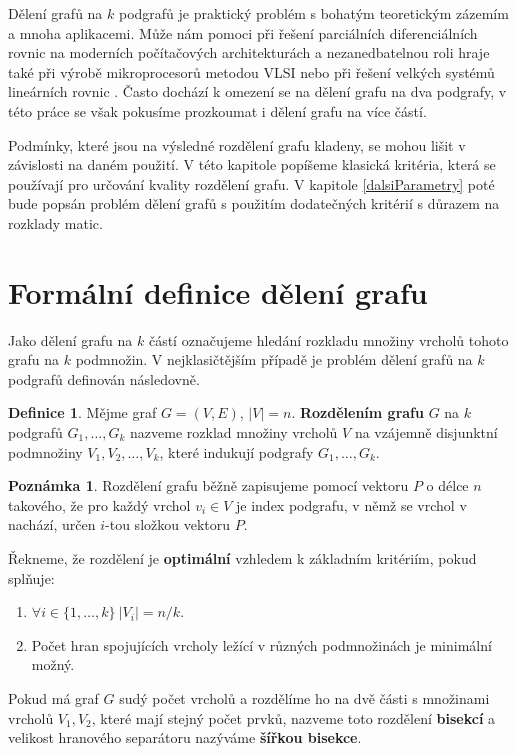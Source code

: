 \documentclass[11pt,american,czech,oneside]{book}
\theoremstyle{plain}
\theoremstyle{definition}
\newtheorem{definition}{Definice}
\newtheorem{remark}{Poznámka}
\begin{document}
Dělení grafů na $k$ podgrafů je praktický problém s bohatým teoretickým zázemím a mnoha aplikacemi. Může nám pomoci při řešení parciálních diferenciálních rovnic na moderních počítačových architekturách \cite{posl:90} a nezanedbatelnou roli hraje také při výrobě mikroprocesorů metodou VLSI nebo při řešení velkých systémů lineárních rovnic \cite{keli:70, pis:84}. Často dochází k omezení se na dělení grafu na dva podgrafy, v této práce se však pokusíme prozkoumat i dělení grafu na více částí.

Podmínky, které jsou na výsledné rozdělení grafu kladeny, se mohou lišit v závislosti na daném použití. V této kapitole popíšeme klasická kritéria, která se používají pro určování kvality rozdělení grafu. V kapitole \ref{dalsiParametry} poté bude popsán problém dělení grafů s použitím dodatečných kritérií s důrazem na rozklady matic.

\section{Formální definice dělení grafu}

Jako dělení grafu na $k$ částí označujeme hledání rozkladu množiny vrcholů tohoto grafu na $k$ podmnožin. V nejklasičtějším případě je problém dělení grafů na $k$ podgrafů definován následovně.
\begin{definition}
  Mějme graf $G=(V,E)$, $|V| = n$. \textbf{Rozdělením grafu} $G$ na $k$ podgrafů $G_1, \ldots, G_k$ nazveme rozklad množiny vrcholů $V$ na vzájemně disjunktní podmnožiny $V_1, V_2, \ldots, V_k$, které indukují podgrafy $G_1, \ldots, G_k$.   
\end{definition}

\begin{remark}
  Rozdělení grafu běžně zapisujeme pomocí vektoru $P$ o délce $n$ takového, že pro každý vrchol $v_i \in V$ je index podgrafu, v němž se vrchol v nachází, určen $i$-tou složkou vektoru $P$.  
\end{remark}

Řekneme, že rozdělení je \textbf{optimální} vzhledem k základním kritériím, pokud splňuje:
\begin{enumerate}
  \item $\forall i \in \{1, \ldots, k \} \ |V_i|=n/k$.
  \item Počet hran spojujících vrcholy ležící v různých podmnožinách je minimální možný.
\end{enumerate}

Pokud má graf $G$ sudý počet vrcholů a rozdělíme ho na dvě části s množinami vrcholů $V_1, V_2$, které mají stejný počet prvků, nazveme toto rozdělení \textbf{bisekcí} a velikost hranového separátoru nazýváme \textbf{šířkou bisekce}.
\end{document}
